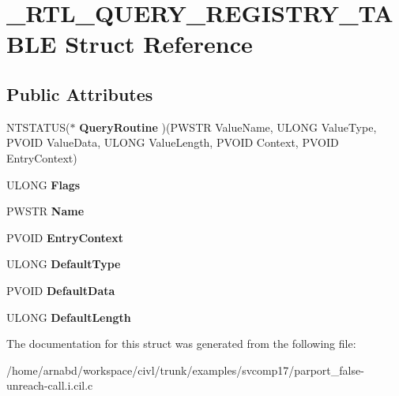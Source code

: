 \hypertarget{struct__RTL__QUERY__REGISTRY__TABLE}{}\section{\+\_\+\+R\+T\+L\+\_\+\+Q\+U\+E\+R\+Y\+\_\+\+R\+E\+G\+I\+S\+T\+R\+Y\+\_\+\+T\+A\+B\+L\+E Struct Reference}
\label{struct__RTL__QUERY__REGISTRY__TABLE}
\subsection*{Public Attributes}
\begin{DoxyCompactItemize}
\item 
\hypertarget{struct__RTL__QUERY__REGISTRY__TABLE_abbd1788eaf2274878fe4cbd5e6b61de3}{}N\+T\+S\+T\+A\+T\+U\+S($\ast$ {\bfseries Query\+Routine} )(P\+W\+S\+T\+R Value\+Name, U\+L\+O\+N\+G Value\+Type, P\+V\+O\+I\+D Value\+Data, U\+L\+O\+N\+G Value\+Length, P\+V\+O\+I\+D Context, P\+V\+O\+I\+D Entry\+Context)\label{struct__RTL__QUERY__REGISTRY__TABLE_abbd1788eaf2274878fe4cbd5e6b61de3}

\item 
\hypertarget{struct__RTL__QUERY__REGISTRY__TABLE_a7300ff2835155bd276fa8b24d246539c}{}U\+L\+O\+N\+G {\bfseries Flags}\label{struct__RTL__QUERY__REGISTRY__TABLE_a7300ff2835155bd276fa8b24d246539c}

\item 
\hypertarget{struct__RTL__QUERY__REGISTRY__TABLE_a02bb1408f29dbed00cb59d2a5730b696}{}P\+W\+S\+T\+R {\bfseries Name}\label{struct__RTL__QUERY__REGISTRY__TABLE_a02bb1408f29dbed00cb59d2a5730b696}

\item 
\hypertarget{struct__RTL__QUERY__REGISTRY__TABLE_a8814fdfb9d1b14abbc619167b0bad4a5}{}P\+V\+O\+I\+D {\bfseries Entry\+Context}\label{struct__RTL__QUERY__REGISTRY__TABLE_a8814fdfb9d1b14abbc619167b0bad4a5}

\item 
\hypertarget{struct__RTL__QUERY__REGISTRY__TABLE_a971e2a7d3023e44e164f2e27e5c4a298}{}U\+L\+O\+N\+G {\bfseries Default\+Type}\label{struct__RTL__QUERY__REGISTRY__TABLE_a971e2a7d3023e44e164f2e27e5c4a298}

\item 
\hypertarget{struct__RTL__QUERY__REGISTRY__TABLE_a18902114a1d3d8e0f0600b64dd5b09b5}{}P\+V\+O\+I\+D {\bfseries Default\+Data}\label{struct__RTL__QUERY__REGISTRY__TABLE_a18902114a1d3d8e0f0600b64dd5b09b5}

\item 
\hypertarget{struct__RTL__QUERY__REGISTRY__TABLE_aadbce9163db26d263f7d173380e60152}{}U\+L\+O\+N\+G {\bfseries Default\+Length}\label{struct__RTL__QUERY__REGISTRY__TABLE_aadbce9163db26d263f7d173380e60152}

\end{DoxyCompactItemize}


The documentation for this struct was generated from the following file\+:\begin{DoxyCompactItemize}
\item 
/home/arnabd/workspace/civl/trunk/examples/svcomp17/parport\+\_\+false-\/unreach-\/call.\+i.\+cil.\+c\end{DoxyCompactItemize}
